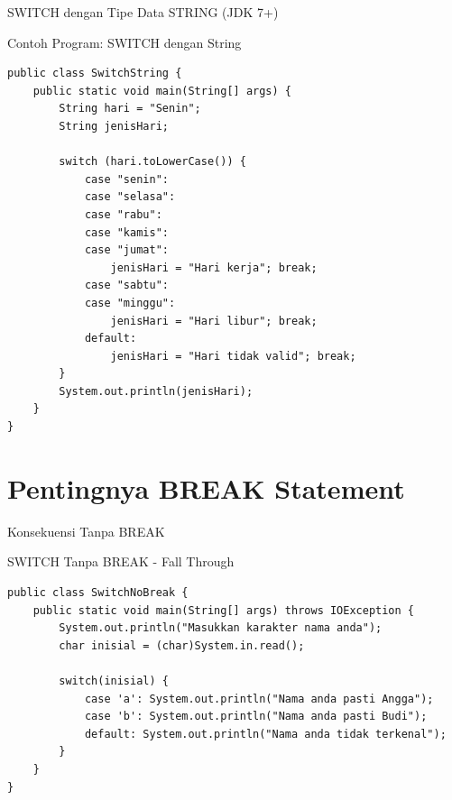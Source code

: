 \documentclass{beamer}
\begin{document}
\begin{frame}[fragile]{SWITCH dengan Tipe Data STRING (JDK 7+)}
  \begin{exampleblock}{Contoh Program: SWITCH dengan String}
    \begin{lstlisting}
public class SwitchString {
    public static void main(String[] args) {
        String hari = "Senin";
        String jenisHari;
        
        switch (hari.toLowerCase()) {
            case "senin": 
            case "selasa": 
            case "rabu": 
            case "kamis": 
            case "jumat": 
                jenisHari = "Hari kerja"; break;
            case "sabtu": 
            case "minggu": 
                jenisHari = "Hari libur"; break;
            default: 
                jenisHari = "Hari tidak valid"; break;
        }
        System.out.println(jenisHari);
    }
}
    \end{lstlisting}
  \end{exampleblock}
\end{frame}

\section{Pentingnya BREAK Statement}
\begin{frame}[fragile]{Konsekuensi Tanpa BREAK}
  \begin{block}{SWITCH Tanpa BREAK - Fall Through}
    \begin{lstlisting}
public class SwitchNoBreak {
    public static void main(String[] args) throws IOException {
        System.out.println("Masukkan karakter nama anda");
        char inisial = (char)System.in.read();
        
        switch(inisial) {
            case 'a': System.out.println("Nama anda pasti Angga");
            case 'b': System.out.println("Nama anda pasti Budi");
            default: System.out.println("Nama anda tidak terkenal");
        }
    }
}
    \end{lstlisting}
  \end{block}
\end{frame}
\end{document}
